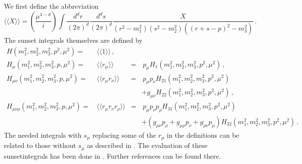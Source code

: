 \documentclass[12pt,a4paper]{article}
\begin{document}
We first define the abbreviation
\begin{equation}
\label{defS}
\langle\langle X \rangle\rangle = 
\left(\frac{\mu^{4-d}}{i}\right)\int \frac{d^d r}{(2\pi)^d} \frac{d^d s}{(2\pi)^d}
 \frac{X}{\left(r^2-m_1^2\right)\left(s^2-m_2^2\right) \left((r+s-p)^2-m_3^2\right) }\,.
\end{equation}
The sunset integrals themselves are defined by
\begin{align}
H(m_1^2,m_2^2,m_3^2,p^2,\mu^2) =\, &
\langle\langle 1 \rangle\rangle\,, &&
\nonumber\\
H_\mu(m_1^2,m_2^2,m_3^2,p,\mu^2) =\, &
\langle\langle r_\mu \rangle\rangle
& = &\,p_\mu H_1(m_1^2,m_2^2,m_3^2,p^2,\mu^2)\,,
\nonumber\\
H_{\mu\nu}(m_1^2,m_2^2,m_3^2,p,\mu^2) =\, &
\langle\langle r_\mu r_\nu\rangle\rangle
&=&\, p_\mu p_\nu H_{21}(m_1^2,m_2^2,m_3^2,p^2,\mu^2)
\nonumber\\ & & &
+g_{\mu\nu} H_{22}(m_1^2,m_2^2,m_3^2,p^2,\mu^2)\,,
\nonumber\\
H_{\mu\nu\rho}(m_1^2,m_2^2,m_3^2,p,\mu^2) =\, &
\langle\langle r_\mu r_\nu r_\rho\rangle\rangle
&=&\, p_\mu p_\nu p_\rho H_{31}(m_1^2,m_2^2,m_3^2,p^2,\mu^2)
\nonumber\\ & & &
+\left(g_{\mu\nu}p_\rho+g_{\mu\rho}p_\nu+g_{\rho\nu}p_\mu\right)
 H_{32}(m_1^2,m_2^2,m_3^2,p^2,\mu^2)\,.
\end{align}
The needed integrals with $s_\mu$ replacing some of the $r_\mu$ in the
definitions can be related to those without $s_\mu$ as described in
\cite{Amoros:1999dp}.
The evaluation of these sunsetintegrals has been done in
\cite{Amoros:1999dp}. Further references can be found there.
\end{document}
